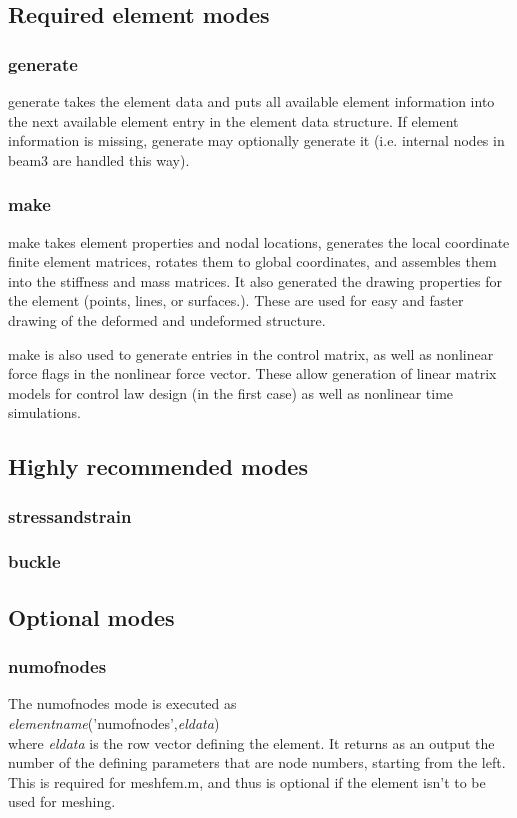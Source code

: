 \documentclass[12pt]{article}
\newcommand*{\command}[1]{\textsf{#1}}
\newcommand*{\varg}[1]{\textit{#1}}
\begin{document}
\subsection{Required element modes}
\subsubsection{\command{generate}}
\command{generate} takes the element data and puts all available
element information into the next available element entry in the
element data structure. If element information is missing, generate
may optionally generate it (i.e. internal nodes in \command{beam3} are
handled this way).
\subsubsection{\command{make}}
\command{make} takes element properties and nodal locations, generates
the local coordinate finite element matrices, rotates them to global
coordinates, and assembles them into the stiffness and mass matrices.
It also generated the drawing properties for the element (points,
lines, or surfaces.). These are used for easy and faster drawing of
the deformed and undeformed structure.

\command{make} is also used to generate entries in the control matrix,
as well as nonlinear force flags in the nonlinear force vector. These
allow generation of linear matrix models for control law design (in
the first case) as well as nonlinear time simulations.
\subsection{Highly recommended modes}
\subsubsection{\command{stressandstrain}}
\subsubsection{\command{buckle}}
\subsection{Optional modes}
\subsubsection{numofnodes}
The \command{numofnodes} mode is executed as\\
\varg{elementname}\command{('numofnodes',}\varg{eldata}\command{)}\\
where \varg{eldata} is the row vector defining the element. It returns
as an output the number of the defining parameters that are node
numbers, starting from the left. This is required for
\textsf{meshfem.m}, and thus is optional if the element isn't to be
used for meshing.
\end{document}

